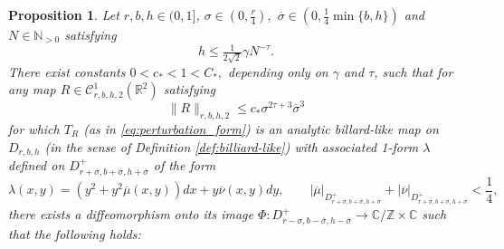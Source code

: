 \documentclass[10pt]{article}
\newtheorem{proposition}[theorem]{Proposition}
\newcommand{\Z}{\mathbb{Z}}
\newcommand{\N}{\mathbb{N}}
\newcommand{\R}{\mathbb{R}}
\newcommand{\C}{\mathbb{C}}
\newcommand{\Domain}[3]{D_{#1, #2, #3}}
\newcommand{\DomainP}[3]{D_{#1, #2, #3}^+}
\begin{document}
\begin{proposition}
\label{prop:estimates_one_step}
 Let $r,b,h\in(0,1]$, $\sigma \in (0, \tfrac{r}{4}),$ $\overline{\sigma} \in (0, \tfrac{1}{4}\min\{b, h\})$ and $N \in \N_{> 0}$ satisfying
 \begin{equation}
 \label{eq:relation_N_h}
 h \leq \tfrac{1}{2\sqrt 2}\gamma N^{-\tau}.
 \end{equation}
 There exist constants $0 < c_{\ast}< 1 < C_\ast ,$  depending only on $\gamma$ and $\tau$, such that for any map $R\in\mathscr C^1_{r,b,h, 2}(\R^2)$ satisfying
 \begin{equation}
 \label{equation:assumption_R}
 \|R\|_{r,b,h,2}\leq c_\ast
\sigma^{2\tau+3}\overline\sigma^3
 \end{equation}
 for which $T_R$ %
 (as in \eqref{eq:perturbation_form}) is an analytic billard-like map on $\Domain{r}{b}{h}$ (in the sense of Definition \ref{def:billiard-like}) with associated 1-form $\lambda$ defined on $\DomainP{r + \overline \sigma}{b + \overline \sigma}{h + \overline \sigma}$ of the form
\[\lambda(x, y) = (y^2 + y^2\overline \mu(x, y))dx + y \overline \nu(x, y)dy, %
\qquad |\overline \mu|_{\DomainP{r + \overline \sigma}{b + \overline \sigma}{h + \overline \sigma}} + |\overline \nu|_{\DomainP{r + \overline \sigma}{b + \overline \sigma}{h + \overline \sigma}} < \frac{1}{4},\]
there exists a diffeomorphism onto its image $\Phi: \DomainP{r - \sigma}{b - \overline \sigma}{h - \overline \sigma} \to \C/\Z \times \C$ such that the following holds:


\end{proposition}
\end{document}
